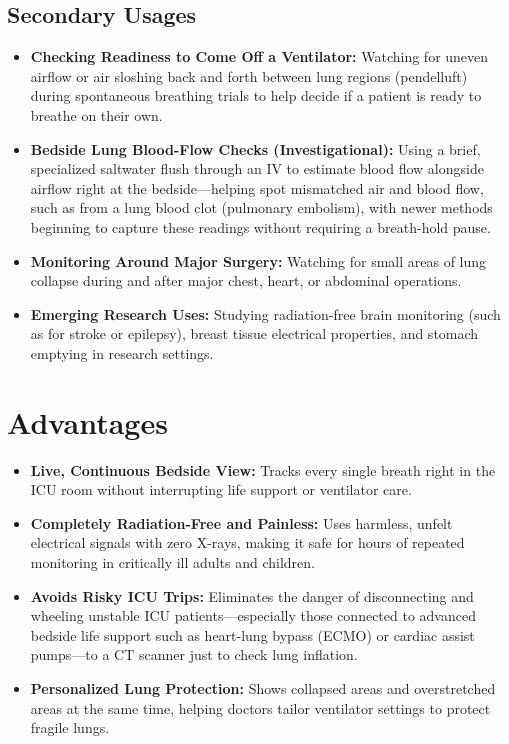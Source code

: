 \subsection{Secondary Usages}
\begin{itemize}
    \item \textbf{Checking Readiness to Come Off a Ventilator:} Watching for uneven airflow or air sloshing back and forth between lung regions (pendelluft) during spontaneous breathing trials to help decide if a patient is ready to breathe on their own.
    \item \textbf{Bedside Lung Blood-Flow Checks (Investigational):} Using a brief, specialized saltwater flush through an IV to estimate blood flow alongside airflow right at the bedside---helping spot mismatched air and blood flow, such as from a lung blood clot (pulmonary embolism), with newer methods beginning to capture these readings without requiring a breath-hold pause.
    \item \textbf{Monitoring Around Major Surgery:} Watching for small areas of lung collapse during and after major chest, heart, or abdominal operations.
    \item \textbf{Emerging Research Uses:} Studying radiation-free brain monitoring (such as for stroke or epilepsy), breast tissue electrical properties, and stomach emptying in research settings.
\end{itemize}

\section{Advantages}
\begin{itemize}
    \item \textbf{Live, Continuous Bedside View:} Tracks every single breath right in the ICU room without interrupting life support or ventilator care.
    \item \textbf{Completely Radiation-Free and Painless:} Uses harmless, unfelt electrical signals with zero X-rays, making it safe for hours of repeated monitoring in critically ill adults and children.
    \item \textbf{Avoids Risky ICU Trips:} Eliminates the danger of disconnecting and wheeling unstable ICU patients---especially those connected to advanced bedside life support such as heart-lung bypass (ECMO) or cardiac assist pumps---to a CT scanner just to check lung inflation.
    \item \textbf{Personalized Lung Protection:} Shows collapsed areas and overstretched areas at the same time, helping doctors tailor ventilator settings to protect fragile lungs.
\end{itemize}

